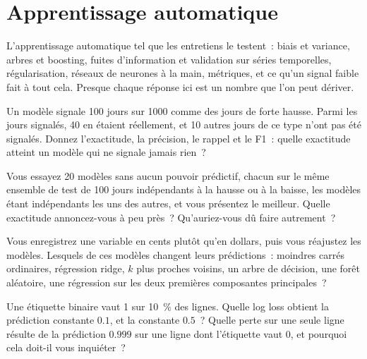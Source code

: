 \chapter{Apprentissage automatique}\label{ch:iv1:machine-learning}

\begin{ivtrains}
L'apprentissage automatique tel que les entretiens le testent~: biais et variance, arbres et boosting, fuites d'information et validation sur séries temporelles, régularisation, réseaux de neurones à la main, métriques, et ce qu'un signal faible fait à tout cela. Presque chaque réponse ici est un nombre que l'on peut dériver.
\end{ivtrains}

\begin{question}\label{iq:iv1:machine-learning:1}
Un modèle signale 100 jours sur 1000 comme des jours de forte hausse. Parmi les jours signalés, 40 en étaient réellement, et 10 autres jours de ce type n'ont pas été signalés. Donnez l'exactitude, la précision, le rappel et le F1~: quelle exactitude atteint un modèle qui ne signale jamais rien~?
\end{question}

\begin{question}\label{iq:iv1:machine-learning:2}
Vous essayez 20 modèles sans aucun pouvoir prédictif, chacun sur le même ensemble de test de 100 jours indépendants à la hausse ou à la baisse, les modèles étant indépendants les uns des autres, et vous présentez le meilleur. Quelle exactitude annoncez-vous à peu près~? Qu'auriez-vous dû faire autrement~?
\end{question}

\begin{question}\label{iq:iv1:machine-learning:3}
Vous enregistrez une variable en cents plutôt qu'en dollars, puis vous réajustez les modèles. Lesquels de ces modèles changent leurs prédictions~: moindres carrés ordinaires, régression ridge, $k$ plus proches voisins, un arbre de décision, une forêt aléatoire, une régression sur les deux premières composantes principales~?
\end{question}

\begin{question}\label{iq:iv1:machine-learning:4}
Une étiquette binaire vaut 1 sur 10~\% des lignes. Quelle log loss obtient la prédiction constante $0.1$, et la constante $0.5$~? Quelle perte sur une seule ligne résulte de la prédiction $0.999$ sur une ligne dont l'étiquette vaut 0, et pourquoi cela doit-il vous inquiéter~?
\end{question}

